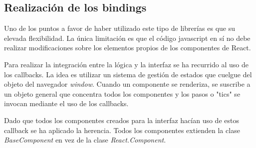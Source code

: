 \subsection{Realización de los bindings}
Uno de los puntos a favor de haber utilizado este tipo de librerías es que su elevada flexibilidad.
La única limitación es que el código javascript en sí no debe realizar modificaciones sobre los 
elementos propios de los componentes de React.

\bigskip
Para realizar la integración entre la lógica y la interfaz se ha recurrido al uso de los callbacks.
La idea es utilizar un sistema de gestión de estados que cuelgue del objeto del navegador \textit{window}.
Cuando un componente se renderiza, se suscribe a un objeto general que concentra todos los componentes
y los pasos o "tics" se invocan mediante el uso de los callbacks.

\bigskip
Dado que todos los componentes creados para la interfaz hacían uso de estos callback se ha aplicado la 
herencia. Todos los componentes extienden la clase \textit{BaseComponent} en vez de la clase 
\textit{React.Component}.
